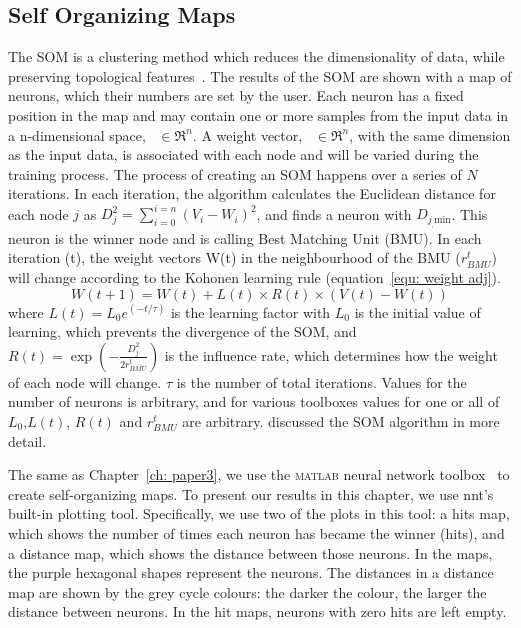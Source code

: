  \subsection{Self Organizing Maps}
 \label{sec: som_SOMZ}
  The SOM is a clustering method which reduces the dimensionality of data, while preserving topological features~\citep{Kohonen98}. 
 The results of the SOM are shown with a map of neurons, which their numbers are set by the user.
 Each neuron has a fixed position in the map and may contain one or more samples from the input data in a n-dimensional space,~ $\in \Re^n$.
 A weight vector,~ $\in \Re^n$, with the same dimension as the input data, is associated with each node and will be varied during the training process.
 The process of creating an SOM happens over a series of $N$ iterations.
 In each iteration, the algorithm calculates the Euclidean distance for each node $j$ as $D_j^2= \sum_{i=0}^{i=n} (V_i - W_i)^2$, and finds a neuron with $D_{j_,\mathrm{min}}$. 
 This neuron is the winner node and is calling Best Matching Unit (BMU). 
 In each iteration (t), the weight vectors W(t) in the neighbourhood of the BMU ($r^t_{BMU}$) will change according to the Kohonen learning rule (equation~\ref{equ: weight adj}). 
  \begin{equation}
            \label{equ: weight adj}
            W(t+1)=W(t)+L(t) \times R(t) \times(V(t)-W(t))
 \end{equation}
where $L(t) = L_0 e^{(-t/\tau)}$ is the learning factor with $L_0$ is the initial value of learning, which prevents the divergence of the SOM, and $R(t)=\exp(-\frac{D_j^2}{2r^t_{BMU}})$ is the influence rate, which determines how the weight of each node will change. 
$\tau$ is the number of total iterations.
Values for the number of neurons is arbitrary, and for various toolboxes values for one or all of $L_0$,$L(t)$, $R(t)$  and $r^t_{BMU}$ are arbitrary.
\cite{Geach12} discussed the SOM algorithm in more detail.


     The same as Chapter~\ref{ch: paper3}, we use the \textsc{matlab} neural network toolbox~\citep[NNT,][]{matlabtolbox} to create self-organizing maps.
     To present our results in this chapter, we use {\sc nnt}'s built-in plotting tool.
     Specifically, we use two of the plots in this tool: a hits map, which shows the number of times each neuron has became the winner (hits), and a distance map, which shows the distance between those neurons.
     In the maps, the purple hexagonal shapes represent the neurons. 
     The distances in a distance map are shown by the grey cycle colours:
     the darker the colour, the larger the distance between neurons.
     In the hit maps, neurons with zero hits are left empty.

